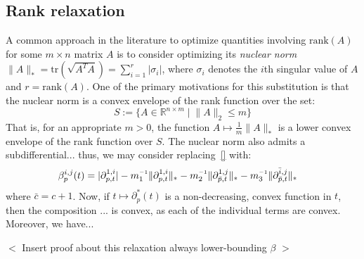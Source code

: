 \documentclass[10pt]{article}
\newcommand{\+}{%
	\raisebox{0.18ex}{\scaleobj{0.55}{+}}
}
\newcommand{\inv}{^{\raisebox{.2ex}{$\scriptscriptstyle-1$}}}
\begin{document}
\subsection*{Rank relaxation}
A common approach in the literature to optimize quantities involving $\mathrm{rank}(A)$ for some $m \times n$ matrix $A$ is to consider optimizing its \emph{nuclear norm} $\lVert A \rVert_\ast = \mathrm{tr}(\sqrt{A^T A}) = \sum_{i=1}^r \lvert \sigma_i \rvert$, where $\sigma_i$ denotes the $i$th singular value of $A$ and $r=\mathrm{rank}(A)$. One of the primary motivations for this substitution is that the nuclear norm is a convex envelope of the rank function over the set: 
$$
S := \{ A \in \mathbb{R}^{n \times m} \mid \lVert A \rVert_2 \leq m \}
$$
That is, for an appropriate $m > 0$, the function $A \mapsto \frac{1}{m}\lVert A \rVert_\ast$ is a lower convex envelope of the rank function over $S$. The nuclear norm also admits a subdifferential... thus, we may consider replacing~\eqref{} with: 
\begin{align}\label{eq:betti_four_nuc}
	\beta_p^{i,j}(t) &= \lvert \partial_{p,t}^{1,i} \rvert -
	m_1\inv \lVert \partial_{p,t}^{1,i} \rVert_\ast - 
	m_2\inv \lVert \partial_{\bar{p},t}^{1,j}\rVert_\ast - 
	m_3\inv \lVert\partial_{\bar{p},t}^{\bar{i},j}\rVert_\ast 
\end{align}
where $\bar{c} = c + 1$. Now, if $t \mapsto \partial_p^\ast(t)$ is a non-decreasing, convex function in $t$, then the composition ... is convex, as each of the individual terms are convex. Moreover, we have...

$<$ Insert proof about this relaxation always lower-bounding $\beta$ $>$
\end{document}
